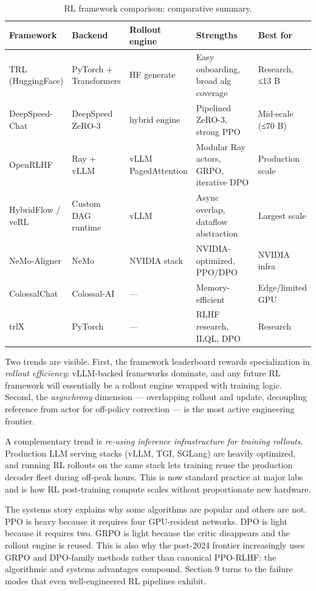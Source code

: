 \documentclass{article}
\begin{document}
\begin{table}[t]
\centering
\caption{RL framework comparison: comparative summary.}
\label{tab:rl-framework-comparison}
\begin{tabular}{>{\raggedright\arraybackslash}p{0.1491\linewidth}
  >{\raggedright\arraybackslash}p{0.1930\linewidth}
  >{\raggedright\arraybackslash}p{0.1667\linewidth}
  >{\raggedright\arraybackslash}p{0.3421\linewidth}
  >{\raggedright\arraybackslash}p{0.1491\linewidth}}
\toprule
Framework & Backend & Rollout engine & Strengths & Best for \\
\midrule
TRL (HuggingFace) & PyTorch + Transformers & HF generate & Easy onboarding, broad alg coverage & Research, ≤13 B \\
DeepSpeed-Chat & DeepSpeed ZeRO-3 & hybrid engine & Pipelined ZeRO-3, strong PPO & Mid-scale (≤70 B) \\
OpenRLHF & Ray + vLLM & vLLM PagedAttention & Modular Ray actors, GRPO, iterative DPO & Production scale \\
HybridFlow / veRL & Custom DAG runtime & vLLM & Async overlap, dataflow abstraction & Largest scale \\
NeMo-Aligner & NeMo & NVIDIA stack & NVIDIA-optimized, PPO/DPO & NVIDIA infra \\
ColossalChat & Colossal-AI & --- & Memory-efficient & Edge/limited GPU \\
trlX & PyTorch & --- & RLHF research, ILQL, DPO & Research \\
\end{tabular}
\end{table}

Two trends are visible. First, the framework leaderboard rewards specialization in \emph{rollout efficiency}: vLLM-backed frameworks dominate, and any future RL framework will essentially be a rollout engine wrapped with training logic. Second, the \emph{asynchrony} dimension --- overlapping rollout and update, decoupling reference from actor for off-policy correction --- is the most active engineering frontier.

A complementary trend is \emph{re-using inference infrastructure for training rollouts}. Production LLM serving stacks (vLLM, TGI, SGLang) are heavily optimized, and running RL rollouts on the same stack lets training reuse the production decoder fleet during off-peak hours. This is now standard practice at major labs and is how RL post-training compute scales without proportionate new hardware.

The systems story explains why some algorithms are popular and others are not. PPO is heavy because it requires four GPU-resident networks. DPO is light because it requires two. GRPO is light because the critic disappears and the rollout engine is reused. This is also why the post-2024 frontier increasingly uses GRPO and DPO-family methods rather than canonical PPO-RLHF: the algorithmic and systems advantages compound. Section 9 turns to the failure modes that even well-engineered RL pipelines exhibit.
\end{document}
